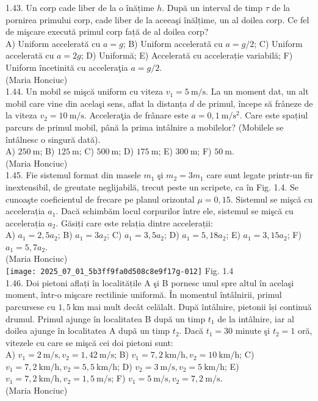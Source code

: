 1.43. Un corp cade liber de la o înățime $h$. După un interval de timp $\tau$ de la pornirea primului corp, cade liber de la aceeaşi înălțime, un al doilea corp. Ce fel de mişcare execută primul corp față de al doilea corp?\\ A) Uniform accelerată cu $a=g$; B) Uniform acceleratã cu $a=g / 2$; C) Uniform accelerată cu $a=2 g$; D) Uniformă; E) Accelerată cu accelerație variabilă; F) Uniform încetinită cu acceleraţia $a=g / 2$.\\ (Maria Honciuc)\\

1.44. Un mobil se mişcă uniform cu viteza $v_{1}=5 \mathrm{~m} / \mathrm{s}$. La un moment dat, un alt mobil care vine din acelaşi sens, aflat la distanța $d$ de primul, începe să frâneze de la viteza $v_{2}=10 \mathrm{~m} / \mathrm{s}$. Acceleraţia de frânare este $a=0,1 \mathrm{~m} / \mathrm{s}^{2}$. Care este spațiul parcurs de primul mobil, până la prima intâlnire a mobilelor? (Mobilele se întâlnesc o singură dată).\\ A) $250 \mathrm{~m}$; B) $125 \mathrm{~m}$; C) $500 \mathrm{~m}$; D) $175 \mathrm{~m}$; E) $300 \mathrm{~m}$; F) $50 \mathrm{~m}$.\\ (Maria Honciuc)\\

1.45. Fie sistemul format din masele $m_{1}$ şi $m_{2}=3 m_{1}$ care sunt legate printr-un fir inextensibil, de greutate neglijabilă, trecut peste un scripete, ca în Fig. 1.4. Se cunoaşte coeficientul de frecare pe planul orizontal $\mu=0,15$. Sistemul se mişcă cu accelerația $a_{1}$. Dacă schimbăm locul corpurilor între ele, sistemul se mişcă cu accelerația $a_{2}$. Găsiți care este relația dintre accelerații:\\ A) $a_{1}=2,5 a_{2}$; B) $a_{1}=3 a_{2}$; C) $a_{1}=3,5 a_{2}$; D) $a_{1}=5,18 a_{2}$; E) $a_{1}=3,15 a_{2}$; F) $a_{1}=5,7 a_{2}$.\\ (Maria Honciuc)\\ \texttt{[image: 2025\_07\_01\_5b3ff9fa0d508c8e9f17g-012]} Fig. 1.4\\

1.46. Doi pietoni aflați în localitățile A şi B pornesc unul spre altul în acelaşi moment, într-o mişcare rectilinie uniformă. În momentul întâlnirii, primul parcursese cu $1,5 \mathrm{~km}$ mai mult decât celălalt. După întâlnire, pietonii își continuă drumul. Primul ajunge în localitatea B după un timp $t_{1}$ de la intâlnire, iar al doilea ajunge în localitatea A dupã un timp $t_{2}$. Dacă $t_{1}=30$ minute şi $t_{2}=1$ oră, vitezele cu care se mişcă cei doi pietoni sunt:\\ A) $v_{1}=2 \mathrm{~m} / \mathrm{s}, v_{2}=1,42 \mathrm{~m} / \mathrm{s}$; B) $v_{1}=7,2 \mathrm{~km} / \mathrm{h}, v_{2}=10 \mathrm{~km} / \mathrm{h}$; C) $v_{1}=7,2 \mathrm{~km} / \mathrm{h}, v_{2}=5,5 \mathrm{~km} / \mathrm{h}$; D) $v_{2}=3 \mathrm{~m} / \mathrm{s}, v_{2}=5 \mathrm{~km} / \mathrm{h}$; E) $v_{1}=7,2 \mathrm{~km} / \mathrm{h}, v_{2}=1,5 \mathrm{~m} / \mathrm{s}$; F) $v_{1}=5 \mathrm{~m} / \mathrm{s}, v_{2}=7,2 \mathrm{~m} / \mathrm{s}$.\\ (Maria Honciuc)\\

